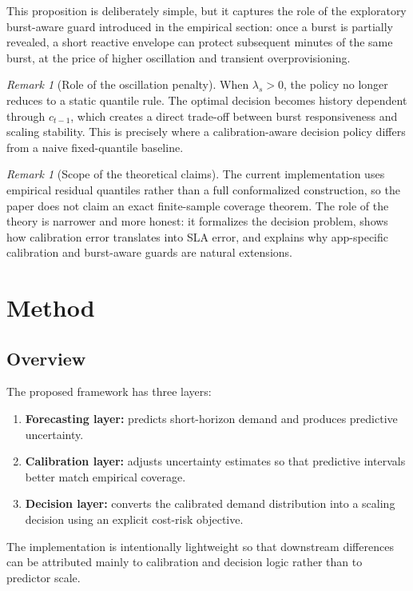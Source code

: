 \documentclass[11pt]{article}
\theoremstyle{plain}
\theoremstyle{definition}
\theoremstyle{remark}
\newtheorem{remark}[theorem]{Remark}
\begin{document}
This proposition is deliberately simple, but it captures the role of the exploratory burst-aware guard introduced in the empirical section: once a burst is partially revealed, a short reactive envelope can protect subsequent minutes of the same burst, at the price of higher oscillation and transient overprovisioning.

\begin{remark}[Role of the oscillation penalty]
When $\lambda_s > 0$, the policy no longer reduces to a static quantile rule. The optimal decision becomes history dependent through $c_{t-1}$, which creates a direct trade-off between burst responsiveness and scaling stability. This is precisely where a calibration-aware decision policy differs from a naive fixed-quantile baseline.
\end{remark}

\begin{remark}[Scope of the theoretical claims]
The current implementation uses empirical residual quantiles rather than a full conformalized construction, so the paper does not claim an exact finite-sample coverage theorem. The role of the theory is narrower and more honest: it formalizes the decision problem, shows how calibration error translates into SLA error, and explains why app-specific calibration and burst-aware guards are natural extensions.
\end{remark}

\section{Method}
\label{sec:method}
\subsection{Overview}
The proposed framework has three layers:
\begin{enumerate}[leftmargin=1.2cm]
    \item \textbf{Forecasting layer:} predicts short-horizon demand and produces predictive uncertainty.
    \item \textbf{Calibration layer:} adjusts uncertainty estimates so that predictive intervals better match empirical coverage.
    \item \textbf{Decision layer:} converts the calibrated demand distribution into a scaling decision using an explicit cost-risk objective.
\end{enumerate}
The implementation is intentionally lightweight so that downstream differences can be attributed mainly to calibration and decision logic rather than to predictor scale.
\end{document}
